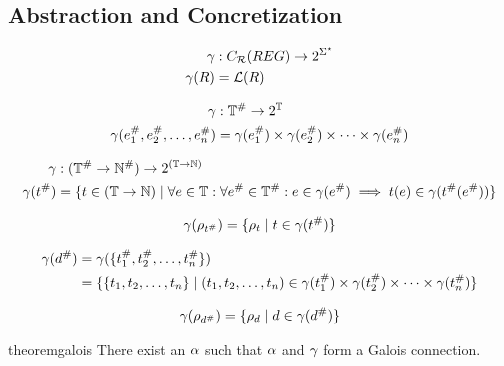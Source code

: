 \subsection{Abstraction and Concretization}\label{subsec:abstraction-and-concretization}

\begin{align}
    \gamma &: C_{\mathcal{R}}(REG) \rightarrow 2^{\Sigma^\star} \\
    \gamma(R) &= \mathcal{L}(R)
\end{align}

\begin{align}
    \gamma &: \mathbb{T}^\# \rightarrow 2^\mathbb{T} \\
    \gamma (e_1^\#, e_2^\#, \dots, e_n^\#) &= \gamma(e_1^\#) \times \gamma(e_2^\#) \times \dots \times \gamma(e_n^\#)
\end{align}

\begin{align}
    \gamma &: (\mathbb{T}^\# \rightarrow \mathbb{N}^\#) \rightarrow 2^{(\mathbb{T} \rightarrow \mathbb{N})} \\
    \gamma(t^\#) &= \{t \in (\mathbb{T} \rightarrow \mathbb{N}) \mid \forall e \in \mathbb{T} : \forall e^\# \in \mathbb{T}^\# : e \in \gamma(e^\#) \implies t(e) \in \gamma(t^\#(e^\#))\}
\end{align}

\begin{align}
    \gamma(\rho_{t^\#}) = \{ \rho_{t} \mid t \in \gamma(t^\#) \}
\end{align}

\begin{align}
    \gamma(d^\#) &= \gamma(\{t_1^\#, t_2^\#, \dots, t_n^\#\}) \\
                    &= \{ \{ t_1, t_2, \dots, t_n \} \mid (t_1, t_2, \dots, t_n) \in \gamma(t_1^\#) \times \gamma(t_2^\#) \times \dots \times \gamma(t_n^\#) \}
\end{align}

\begin{align}
    \gamma(\rho_{d^\#}) = \{ \rho_{d} \mid d \in \gamma(d^\#) \}
\end{align}

\begin{restatable}{theorem}{galois}\label{thm:galios}
    There exist an $\alpha$ such that $\alpha$ and $\gamma$ form a Galois connection.
\end{restatable}

